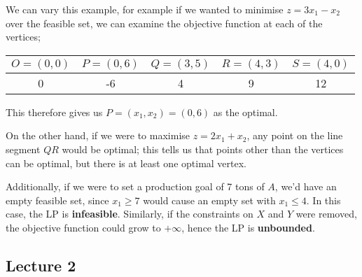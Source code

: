 \documentclass[a4paper, 12pt]{article}
\begin{document}
                We can vary this example, for example if we wanted to minimise $z = 3x_1 - x_2$ over the feasible set, we can examine the objective function at each of the vertices;
                \begin{center}
                    \begin{tabular}{c|c|c|c|c}
                        $O = (0, 0)$ & $P = (0, 6)$ & $Q = (3, 5)$ & $R = (4, 3)$ & $S = (4, 0)$ \\
                        \hline
                        0 & -6 & 4 & 9 & 12
                    \end{tabular}
                \end{center}
                This therefore gives us $P = (x_1, x_2) = (0, 6)$ as the optimal.
                \medskip

                On the other hand, if we were to maximise $z = 2x_1 + x_2$, any point on the line segment $QR$ would be optimal; this tells us that points other than the vertices can be optimal, but there is at least one optimal vertex.
                \medskip

                Additionally, if we were to set a production goal of 7 tons of $A$, we'd have an empty feasible set, since $x_1 \geq 7$ would cause an empty set with $x_1 \leq 4$.
                In this case, the LP is \textbf{infeasible}.
                Similarly, if the constraints on $X$ and $Y$ were removed, the objective function could grow to $+\infty$, hence the LP is \textbf{unbounded}.
        \subsection*{Lecture 2}
\end{document}
